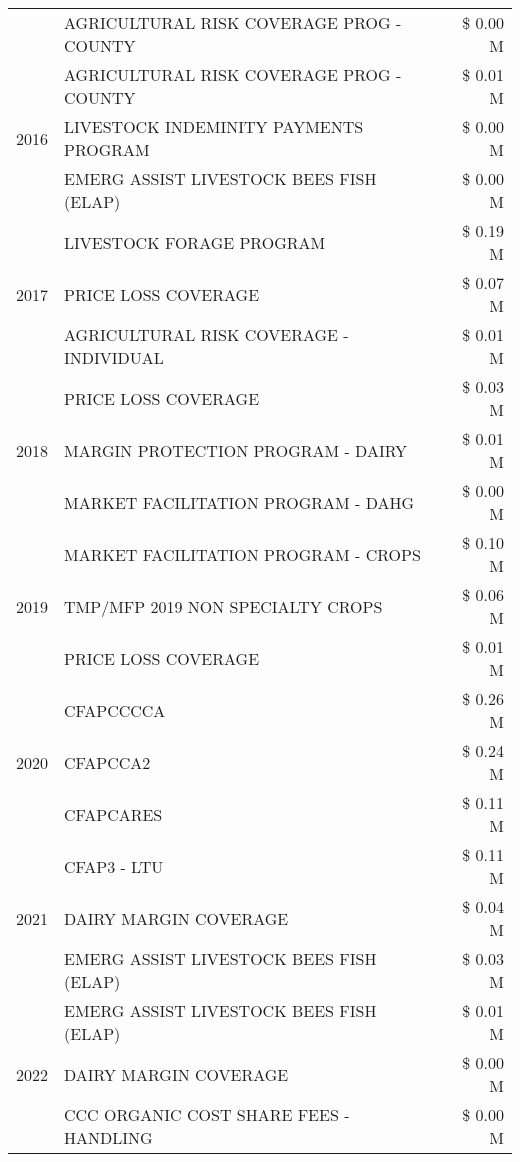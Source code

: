 \begin{tabular}{llr}
 & AGRICULTURAL RISK COVERAGE PROG - COUNTY & \$ 0.00 M \\
\cline{1-3}
\multirow[t]{3}{*}{2016} & AGRICULTURAL RISK COVERAGE PROG - COUNTY & \$ 0.01 M \\
 & LIVESTOCK INDEMINITY PAYMENTS PROGRAM & \$ 0.00 M \\
 & EMERG ASSIST LIVESTOCK BEES FISH (ELAP) & \$ 0.00 M \\
\cline{1-3}
\multirow[t]{3}{*}{2017} & LIVESTOCK FORAGE PROGRAM & \$ 0.19 M \\
 & PRICE LOSS COVERAGE & \$ 0.07 M \\
 & AGRICULTURAL RISK COVERAGE - INDIVIDUAL & \$ 0.01 M \\
\cline{1-3}
\multirow[t]{3}{*}{2018} & PRICE LOSS COVERAGE & \$ 0.03 M \\
 & MARGIN PROTECTION PROGRAM - DAIRY & \$ 0.01 M \\
 & MARKET FACILITATION PROGRAM - DAHG & \$ 0.00 M \\
\cline{1-3}
\multirow[t]{3}{*}{2019} & MARKET FACILITATION PROGRAM - CROPS & \$ 0.10 M \\
 & TMP/MFP 2019 NON SPECIALTY CROPS & \$ 0.06 M \\
 & PRICE LOSS COVERAGE & \$ 0.01 M \\
\cline{1-3}
\multirow[t]{3}{*}{2020} & CFAPCCCCA & \$ 0.26 M \\
 & CFAPCCA2 & \$ 0.24 M \\
 & CFAPCARES & \$ 0.11 M \\
\cline{1-3}
\multirow[t]{3}{*}{2021} & CFAP3 - LTU & \$ 0.11 M \\
 & DAIRY MARGIN COVERAGE & \$ 0.04 M \\
 & EMERG ASSIST LIVESTOCK BEES FISH (ELAP) & \$ 0.03 M \\
\cline{1-3}
\multirow[t]{3}{*}{2022} & EMERG ASSIST LIVESTOCK BEES FISH (ELAP) & \$ 0.01 M \\
 & DAIRY MARGIN COVERAGE & \$ 0.00 M \\
 & CCC ORGANIC COST SHARE FEES - HANDLING & \$ 0.00 M \\
\cline{1-3}
\bottomrule
\end{tabular}
